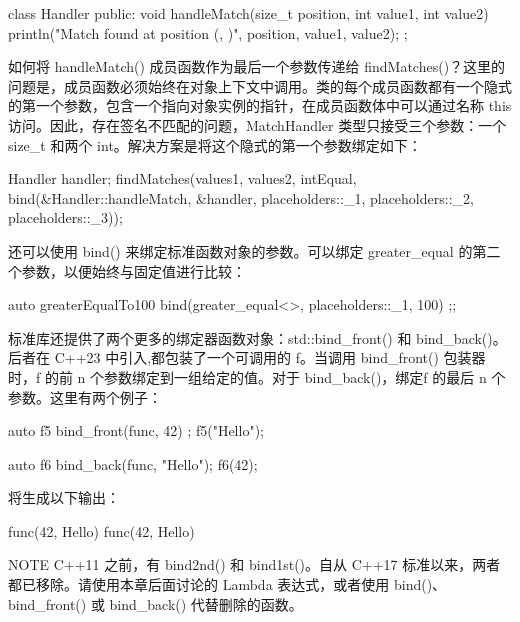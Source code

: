 \begin{cpp}
class Handler
{
    public:
        void handleMatch(size_t position, int value1, int value2)
        {
            println("Match found at position {} ({}, {})",
                position, value1, value2);
        }
};
\end{cpp}

如何将 handleMatch() 成员函数作为最后一个参数传递给 findMatches()？这里的问题是，成员函数必须始终在对象上下文中调用。类的每个成员函数都有一个隐式的第一个参数，包含一个指向对象实例的指针，在成员函数体中可以通过名称 this 访问。因此，存在签名不匹配的问题，MatchHandler 类型只接受三个参数：一个 size\_t 和两个 int。解决方案是将这个隐式的第一个参数绑定如下：

\begin{cpp}
Handler handler;
findMatches(values1, values2, intEqual, bind(&Handler::handleMatch, &handler,
            placeholders::_1, placeholders::_2, placeholders::_3));
\end{cpp}

还可以使用 bind() 来绑定标准函数对象的参数。可以绑定 greater\_equal 的第二个参数，以便始终与固定值进行比较：

\begin{cpp}
auto greaterEqualTo100 { bind(greater_equal<>{}, placeholders::_1, 100) };;
\end{cpp}

标准库还提供了两个更多的绑定器函数对象：std::bind\_front() 和 bind\_back()。后者在 C++23 中引入,都包装了一个可调用的 f。当调用 bind\_front() 包装器时，f 的前 n 个参数绑定到一组给定的值。对于 bind\_back()，绑定f 的最后 n 个参数。这里有两个例子：

\begin{cpp}
auto f5 { bind_front(func, 42) };
f5("Hello");

auto f6 { bind_back(func, "Hello")};
f6(42);
\end{cpp}

将生成以下输出：

\begin{shell}
func(42, Hello)
func(42, Hello)
\end{shell}

\begin{myNotic}{NOTE}
C++11 之前，有 bind2nd() 和 bind1st()。自从 C++17 标准以来，两者都已移除。请使用本章后面讨论的 Lambda 表达式，或者使用 bind()、bind\_front() 或 bind\_back() 代替删除的函数。
\end{myNotic}


